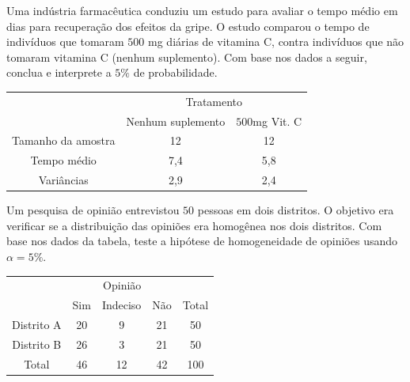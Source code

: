 \documentclass{report}
\begin{document}
\begin{Exercise}
\Question Uma indústria farmacêutica conduziu um estudo para avaliar o tempo médio em dias para recuperação dos efeitos da gripe. O estudo comparou o tempo 
de indivíduos que tomaram $500$ mg diárias de vitamina C, contra  indivíduos que não tomaram vitamina C (nenhum suplemento). Com base nos dados a seguir, 
conclua e interprete a $5\%$ de probabilidade.

\begin{table}[H]
\centering
\begin{tabular}{ccc}
\hline \hline
                                      &\multicolumn{2}{c}{Tratamento}\\
																			\cline{2-3}
                                      &Nenhum suplemento&$500$mg Vit. C        \\
\hline\hline
Tamanho da amostra& 12           &12      \\
Tempo médio            & 7,4           &5,8     \\
Variâncias                   & 2,9          &2,4     \\
\hline \hline
\end{tabular}
\end{table}

\Question Um pesquisa de opinião entrevistou $50$ pessoas em dois distritos. O objetivo era verificar se a distribuição das opiniões era homogênea nos dois distritos. 
Com base nos dados da tabela, teste a hipótese de homogeneidade de opiniões usando $\alpha=5\%.$

\begin{table}[H]
\centering
\begin{tabular}{ccccc}
\hline \hline
                                      &\multicolumn{3}{c}{Opinião}&            \\
																			\cline{2-4}
                                      &Sim&Indeciso&Não             & Total  \\
\hline\hline
Distrito A           & 20           &9 & 21 & 50      \\
Distrito B           & 26           &3 & 21 & 50     \\
\hline
Total                  & 46           &12 &42&100    \\
\hline \hline
\end{tabular}
\end{table}


\end{Exercise}
\end{document}

